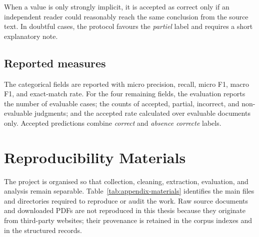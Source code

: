 When a value is only strongly implicit, it is accepted as correct only if an
independent reader could reasonably reach the same conclusion from the source
text. In doubtful cases, the protocol favours the \textit{partiel} label and
requires a short explanatory note.

\section{Reported measures}

The categorical fields are reported with micro precision, recall, micro F1,
macro F1, and exact-match rate. For the four remaining fields, the evaluation
reports the number of evaluable cases; the counts of accepted, partial,
incorrect, and non-evaluable judgments; and the accepted rate calculated over
evaluable documents only. Accepted predictions combine \textit{correct} and
\textit{absence correcte} labels.

\chapter{Reproducibility Materials}

The project is organised so that collection, cleaning, extraction, evaluation,
and analysis remain separable. Table~\ref{tab:appendix-materials} identifies
the main files and directories required to reproduce or audit the work. Raw
source documents and downloaded PDFs are not reproduced in this thesis because
they originate from third-party websites; their provenance is retained in the
corpus indexes and in the structured records.

